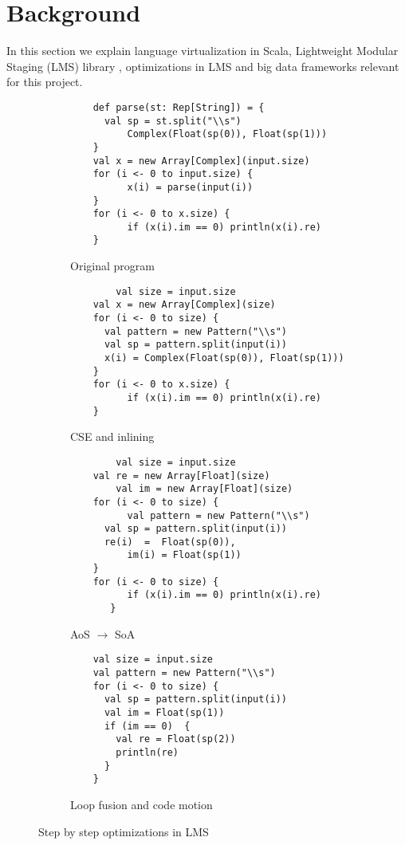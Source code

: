 \section{Background}
\label{sec:background}
In this section we explain language virtualization in Scala, Lightweight Modular Staging (LMS) library \cite{rompf_lightweight_2010, rompf_lightweight_2012}, optimizations in LMS and big data frameworks relevant for this project.
\begin{figure*}
  \begin{subfigure}[b]{.5\linewidth}
    \begin{lstlisting}
  	def parse(st: Rep[String]) = {               
	  val sp = st.split("\\s")
          Complex(Float(sp(0)), Float(sp(1)))
	}
	val x = new Array[Complex](input.size)
	for (i <- 0 to input.size) {
     	  x(i) = parse(input(i)) 
	}
	for (i <- 0 to x.size) {
    	  if (x(i).im == 0) println(x(i).re) 
	}
    \end{lstlisting}
    \caption{Original program}
    \label{lst:original}
  \end{subfigure}
  \begin{subfigure}[b]{.5\linewidth}
    \begin{lstlisting}
        val size = input.size
	val x = new Array[Complex](size)
	for (i <- 0 to size) {
   	  val pattern = new Pattern("\\s") 
	  val sp = pattern.split(input(i))
	  x(i) = Complex(Float(sp(0)), Float(sp(1))) 
	}
	for (i <- 0 to x.size) {
          if (x(i).im == 0) println(x(i).re) 
	}
    \end{lstlisting}
    \caption{CSE and inlining} 
    \label{lst:cse-inline}
  \end{subfigure}
  \begin{subfigure}[b]{.5\linewidth}
    \begin{lstlisting}
        val size = input.size
	val re = new Array[Float](size)
        val im = new Array[Float](size)
	for (i <- 0 to size) {
          val pattern = new Pattern("\\s") 
   	  val sp = pattern.split(input(i))
	  re(i)  =  Float(sp(0)),
          im(i) = Float(sp(1)) 
	}
	for (i <- 0 to size) {
          if (x(i).im == 0) println(x(i).re) 
       }
    \end{lstlisting}
    \caption{AoS $\rightarrow$ SoA}
    \label{lst:aos-soa}
  \end{subfigure}
\begin{subfigure}[b]{.5\linewidth}
    \begin{lstlisting}
	val size = input.size
	val pattern = new Pattern("\\s") 
	for (i <- 0 to size) {
	  val sp = pattern.split(input(i))
 	  val im = Float(sp(1))
	  if (im == 0)  {
	    val re = Float(sp(2))
 	    println(re)
   	  }
	}
    \end{lstlisting}
    \caption{Loop fusion and code motion}
    \label{lst:fusion-motion}
  \end{subfigure}
  \caption{Step by step optimizations in LMS}
  \label{lst:step-by-step-lms}
\end{figure*}


